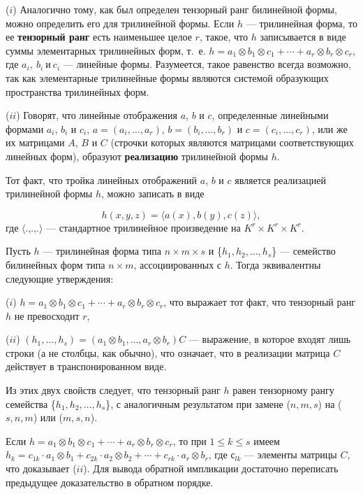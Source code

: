 \documentclass{mai_book}
\renewcommand{\le}{\leqslant}
\begin{document}
  \begin{determ}
($i$) Аналогично тому, как был определен тензорный ранг билинейной формы, можно определить его для трилинейной формы. Если $h$ --- трилинейная форма, то ее \textbf{тензорный ранг} есть наименьшее целое $r$, такое, что $h$ записывается в виде суммы элементарных трилинейных форм, т.~е. $h = a_1 \otimes b_1 \otimes c_1 + \cdots + a_r \otimes b_r \otimes c_r$, где $a_i,\ b_i\ и\ c_i$ --- линейные формы. Разумеется, такое равенство всегда возможно, так как элементарные трилинейные формы являются системой образующих  пространства трилинейных форм.\par
    ($ii$) Говорят, что линейные отображения $a$, $b$ и $c$, определенные линейными формами $a_i$, $b_i$ и $c_i$, $a = (a_i,\dots,a_r)$, $b = (b_i,\dots,b_r)$ и $c= (c_i,\dots,c_r)$, или же их матрицами $A$, $B$ и $C$ (строчки которых являются матрицами соответствующих линейных форм), образуют \textbf{реализацию} трилинейной формы $h$.\par
Тот факт, что тройка линейных отображений $a$, $b$ и $c$ является реализацией трилинейной формы $h$, можно записать в виде\par
  $$h(x,y,z)= \langle a(x), b(y), c(z) \rangle ,$$ где $\langle$.,.,.$\rangle$ --- стандартное трилинейное произведение на $K^r \times K^r \times K^r$.
  \end{determ}
  \begin{predl}
Пусть $h$ --- трилинейная форма типа $n \times m \times s$ и \{$h_1,h_2,\dots,h_s$\} --- семейство билинейных форм типа $n \times m$, ассоциированных с $h$. Тогда эквивалентны следующие утверждения:\par
($i$) $h = a_1 \otimes b_1 \otimes c_1 + \cdots + a_r \otimes b_r \otimes c_r$, что выражает тот факт, что тензорный ранг $h$ не превосходит $r$,\par 
($ii$) $(h_1,\dots,h_s) = (a_1 \otimes b_1,\dots,a_r \otimes b_r)C$ --- выражение, в которое входят лишь строки (а не столбцы, как обычно), что означает, что в реализации матрица $C$ действует в транспонированном виде.\par 
Из этих двух свойств следует, что тензорный ранг $h$ равен тензорному рангу семейства \{$h_1,h_2,\dots,h_s$\}, с аналогичным результатом при замене ($n, m, s$) на ($s, n, m$) или ($m, s, n$).
\end{predl}
\begin{myproof}
  Если $h = a_1 \otimes b_1 \otimes c_1 + \cdots + a_r \otimes b_r \otimes c_r$, то при $1 \le k \le s$ имеем $h_k = c_{1k} \cdot a_1 \otimes b_1 + c_{2k} \cdot a_2 \otimes b_2 + \cdots + c_{rk} \cdot a_r \otimes b_r$, где $с_{lk}$ --- элементы матрицы $C$, что доказывает ($ii$). Для вывода обратной импликации достаточно переписать предыдущее доказательство в обратном порядке.
  \end{myproof}
\end{document}
